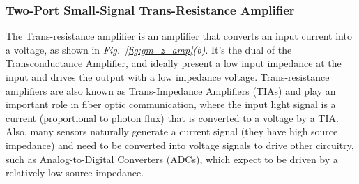 \subsubsection{Two-Port Small-Signal Trans-Resistance Amplifier}
The Trans-resistance amplifier is an amplifier that converts an input current into a voltage, as shown in \emph{Fig.~\ref{fig:gm_z_amp}(b)}.  It's the dual of the Transconductance Amplifier, and ideally present a low input impedance at the input and drives the output with a low impedance voltage.  Trans-resistance amplifiers are also known as Trans-Impedance Amplifiers (TIAs) and play an important role in fiber optic communication, where the input light signal is a current (proportional to photon flux) that is converted to a voltage by a TIA.  Also, many sensors naturally generate a current signal (they have high source impedance) and need to be converted into voltage signals to drive other circuitry, such as Analog-to-Digital Converters (ADCs), which expect to be driven by a relatively low source impedance.  
